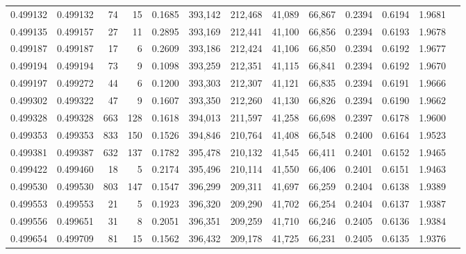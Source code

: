 \begin{tabular}{rrrrrrrrrrrrr}
0.499132 & 0.499132 &    74 &    15 &                                     0.1685 & 393,142 & 212,468 &  41,089 &  66,867 & 0.2394 & 0.6194 & 1.9681 \\
0.499135 & 0.499157 &    27 &    11 &                                     0.2895 & 393,169 & 212,441 &  41,100 &  66,856 & 0.2394 & 0.6193 & 1.9678 \\
0.499187 & 0.499187 &    17 &     6 &                                     0.2609 & 393,186 & 212,424 &  41,106 &  66,850 & 0.2394 & 0.6192 & 1.9677 \\
0.499194 & 0.499194 &    73 &     9 &                                     0.1098 & 393,259 & 212,351 &  41,115 &  66,841 & 0.2394 & 0.6192 & 1.9670 \\
0.499197 & 0.499272 &    44 &     6 &                                     0.1200 & 393,303 & 212,307 &  41,121 &  66,835 & 0.2394 & 0.6191 & 1.9666 \\
0.499302 & 0.499322 &    47 &     9 &                                     0.1607 & 393,350 & 212,260 &  41,130 &  66,826 & 0.2394 & 0.6190 & 1.9662 \\
0.499328 & 0.499328 &   663 &   128 &                                     0.1618 & 394,013 & 211,597 &  41,258 &  66,698 & 0.2397 & 0.6178 & 1.9600 \\
0.499353 & 0.499353 &   833 &   150 &                                     0.1526 & 394,846 & 210,764 &  41,408 &  66,548 & 0.2400 & 0.6164 & 1.9523 \\
0.499381 & 0.499387 &   632 &   137 &                                     0.1782 & 395,478 & 210,132 &  41,545 &  66,411 & 0.2401 & 0.6152 & 1.9465 \\
0.499422 & 0.499460 &    18 &     5 &                                     0.2174 & 395,496 & 210,114 &  41,550 &  66,406 & 0.2401 & 0.6151 & 1.9463 \\
0.499530 & 0.499530 &   803 &   147 &                                     0.1547 & 396,299 & 209,311 &  41,697 &  66,259 & 0.2404 & 0.6138 & 1.9389 \\
0.499553 & 0.499553 &    21 &     5 &                                     0.1923 & 396,320 & 209,290 &  41,702 &  66,254 & 0.2404 & 0.6137 & 1.9387 \\
0.499556 & 0.499651 &    31 &     8 &                                     0.2051 & 396,351 & 209,259 &  41,710 &  66,246 & 0.2405 & 0.6136 & 1.9384 \\
0.499654 & 0.499709 &    81 &    15 &                                     0.1562 & 396,432 & 209,178 &  41,725 &  66,231 & 0.2405 & 0.6135 & 1.9376 \\

\end{tabular}
